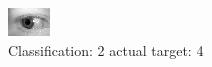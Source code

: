 \begin{figure}[h!]
\begin{center}
\includegraphics[width=0.60\columnwidth]{figures/ID774_class_2_target_4.png}
\end{center}
\caption{ Classification: 2 actual target: 4}
\label{fig:ID774_class_2_target_4}
\end{figure}
